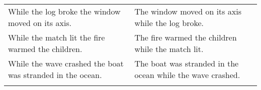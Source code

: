 \begin{center}
\begin{xtabular*}{\textwidth}{p{0.45\textwidth}|p{0.45\textwidth}}
        While the log broke the window moved on its axis. & The window moved on its axis while the log broke. \\
        While the match lit the fire warmed the children. & The fire warmed the children while the match lit. \\
        While the wave crashed the boat was stranded in the ocean. & The boat was stranded in the ocean while the wave crashed. \\
    \label{tab:exp_sentences}
    \end{xtabular*}
\end{center}

\twocolumn